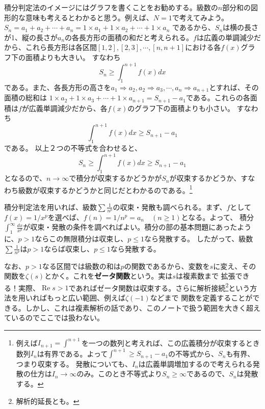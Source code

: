 \documentclass[a4j,dvipdfmx]{jsarticle}
\renewcommand{\Re}{\operatorname{Re}}
\begin{document}
                積分判定法のイメージにはグラフを書くことをお勧めする。級数の$n$部分和の図形的な意味も考えるとわかると思う。例えば、$N=1$で考えてみよう。$S_n=a_1+a_2+\cdots +a_n=1\times a_1 + 1\times a_2 +\cdots+1\times a_n$
                であるから、$S_n$は横の長さが1、縦の長さが$a_n$の各長方形の面積の和だと考えられる。$f$は広義の単調減少だから、これら長方形は各区間$[1,2],[2,3],\cdots,[n,n+1]$における各$f(x)$グラフ下の面積よりも大きい。
                すなわち
                \begin{equation*}
                    S_n \geq \int_1^{n+1} f(x)dx
                \end{equation*}
                である。また、各長方形の高さを$a_1\Rightarrow a_2,a_2\Rightarrow a_3,\cdots,a_{n}\Rightarrow a_{n+1}$とすれば、その面積の総和は
                $1\times a_{2}+1\times a_3+\cdots+1\times a_{n+1}=S_{n+1} - a_1$である。これらの各面積は$f$が広義単調減少だから、各$f(x)$のグラフ下の面積よりも小さい。
                すなわち
                \begin{equation*}
                    \int_{1}^{n+1}f(x)dx \geq S_{n+1}-a_1
                \end{equation*}
                である。
                \clearpage
                以上２つの不等式を合わせると、
                \begin{equation*}
                    S_n \geq \int_{1}^{n+1}f(x)dx \geq S_{n+1}-a_1
                \end{equation*}
                となるので、$n\to \infty$で積分が収束するかどうかが$S_n$が収束するかどうか、すなわち級数が収束するかどうかと同じだとわかるのである。\footnote{例えば$I_{n+1}=\int^{n+1}$を一つの数列と考えれば、この広義積分が収束するとき数列$I_n$は有界である。よって$\int^{n+1}\geq S_{n+1}-a_1$の不等式から、$S_n$も有界、つまり収束する。
                発散についても、$I_n$は広義単調増加するので考えられる発散の仕方は$I_n\to \infty$のみ。このとき不等式より$S_n \geq \infty$であるので、$S_n$は発散する。}

                積分判定法を用いれば、級数$\displaystyle \sum\frac{1}{n^p}$の収束・発散も調べられる。まず、$f$として$f(x)=1/x^p$を選べば、$f(n)=1/n^p =a_n \quad (n\geq 1)$となる。よって、
                積分$\displaystyle \int_{1}^{\infty}\frac{dx}{x^p}$が収束・発散の条件を調べればよい。積分の部の基本問題にあったように、$p>1$ならこの無限積分は収束し、$p\leq 1$なら発散する。
                したがって、級数$\displaystyle \sum \frac{1}{n^p}$は$p>1$ならば収束し、$p\leq 1$なら発散する。

                なお、$p>1$なる区間では級数の和は$p$の関数であるから、変数を$s$に変え、その関数を$\zeta(s)$とかく。これを\textbf{ゼータ関数}という。実は$s$は複素数まで
                拡張できる！実際、$\Re s > 1$であればゼータ関数は収束する。さらに解析接続\footnote{解析的延長とも。}という方法を用いればもっと広い範囲、例えば$\zeta(-1)$などまで
                関数を定義することができる。しかし、これは複素解析の話であり、このノートで扱う範囲を大きく超えているのでここでは扱わない。  
                
\end{document}
